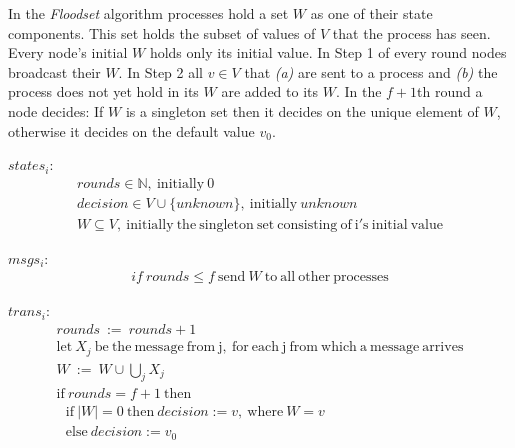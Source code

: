 \documentclass[fleqn]{article}
\begin{document}
In the \textit{Floodset} algorithm processes hold a set $W$ as one of their state components. This set holds the subset of values of $V$ that the process has seen. Every node's initial $W$ holds only its initial value.
In Step 1 of every round nodes broadcast their $W$. In Step 2 all $v ∈ V$ that \textit{(a)} are sent to a process and \textit{(b)} the process does not yet hold in its $W$ are added to its $W$. In the $f+1$th round
a node decides: If $W$ is a singleton set then it decides on the unique element of $W$, otherwise it decides on the default value $v_0$.

\begin{mdframed}[backgroundcolor=light-gray, roundcorner=10pt,leftmargin=1, rightmargin=1, innerleftmargin=15, innertopmargin=15,innerbottommargin=15, outerlinewidth=1, linecolor=light-gray]
\noindent $states_i$:
\begin{gather*}
  rounds   \in  \mathbb{N}, \ \mathrm{initially} \ 0 \\
  decision  \in  V \cup \{ unknown \}, \ \mathrm{initially} \ unknown \\
  W \subseteq V, \ \mathrm{initially \ the\  singleton\  set\  consisting\  of\  i's\  initial\  value}
\end{gather*}
\end{mdframed}

\begin{mdframed}[backgroundcolor=light-gray, roundcorner=10pt,leftmargin=1, rightmargin=1, innerleftmargin=15, innertopmargin=15,innerbottommargin=15, outerlinewidth=1, linecolor=light-gray]
\noindent $msgs_i$:
\begin{gather*}
  if\ rounds \le f\ \mathrm{send}\ W\ \mathrm{to\ all\ other\ processes}
\end{gather*}
\end{mdframed}


\begin{mdframed}[backgroundcolor=light-gray, roundcorner=10pt,leftmargin=1, rightmargin=1, innerleftmargin=15, innertopmargin=15,innerbottommargin=15, outerlinewidth=1, linecolor=light-gray]
\noindent $trans_i$:
\begin{gather*}
  rounds\ :=\ rounds+1\\
  \mathrm{let}\ X_j\ \mathrm{be\ the\ message\ from\ j,\ for\ each\ j\ from\ which\ a\ message\ arrives}\\
  W\ :=\ W \cup \bigcup_{j} X_j\\
  \mathrm{if}\ rounds = f+1\ \mathrm{then}\\
  \ \ \   \mathrm{if}\ |W| = 0\ \mathrm{then}\ decision := v,\ \mathrm{where}\ W = {v}\\
  \ \ \   \mathrm{else}\ decision := v_0
\end{gather*}
\end{mdframed}
\end{document}
